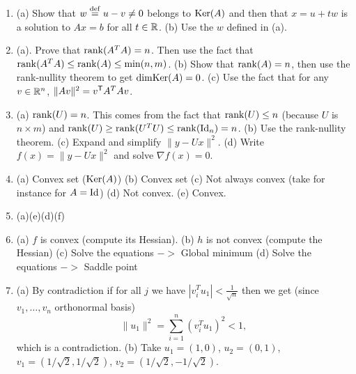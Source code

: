 \documentclass[11pt,nocut]{article}
\begin{document}
\begin{enumerate}
	\item (a) Show that $w \overset{\rm def}{=} u-v \neq 0$ belongs to ${{\rm Ker}}(A)$ and then that $x=u+tw$ is a solution to $Ax=b$ for all $t \in \mathbb{R}$. (b) Use the $w$ defined in (a).
	\item (a). Prove that ${{\rm rank}}(A^T A) = n$. Then use the fact that ${{\rm rank}}(A^T A) \leq {{\rm rank}}(A) \leq \min(n,m)$. (b) Show that ${{\rm rank}}(A) = n$, then use the rank-nullity theorem to get ${{\rm dim}} {{\rm Ker}}(A) = 0$. (c) Use the fact that for any $v \in \mathbb{R}^n$, $\|Av\|^2 = v^{{\sf T}} A^T A v$.
	\item (a) ${{\rm rank}}(U) = n$. This comes from the fact that ${{\rm rank}}(U) \leq n$ (because $U$ is $n \times m$) and ${{\rm rank}}(U) \geq {{\rm rank}}(U^T U) \leq {{\rm rank}}({{\rm Id}}_n) = n$. (b) Use the rank-nullity theorem.
		(c) Expand and simplify $\|y-Ux\|^2$.
		(d) Write $f(x) = \|y-Ux\|^2$ and solve $\nabla f(x) = 0$.
	\item (a) Convex set (${{\rm Ker}}(A)$)
		(b) Convex set
		(c) Not always convex (take for instance for $A={{\rm Id}}$)
		(d) Not convex.
		(e) Convex.
	\item (a)(e)(d)(f)
	\item (a) $f$ is convex (compute its Hessian).
		(b) $h$ is not convex (compute the Hessian)
		(c) Solve the equations $->$ Global minimum
		(d) Solve the equations $->$ Saddle point
	\item (a) By contradiction if for all $j$ we have $|v_i^T u_1| < \frac{1}{\sqrt{n}}$ then we get (since $v_1, \dots, v_n$ orthonormal basis)
		$$
		\|u_1\|^2 = \sum_{i=1}^n (v_i^T u_1)^2 < 1,
		$$
		which is a contradiction.
		(b) Take $u_1=(1,0)$, $u_2=(0,1)$, $v_1 = (1/\sqrt{2}, 1/\sqrt{2})$, $v_2 = (1/\sqrt{2},-1/\sqrt{2})$.
\end{enumerate}

\vspace{1cm}
\centerline{}

%
%
\end{document}
